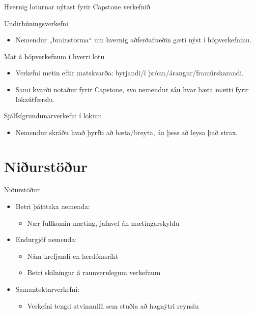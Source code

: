 \documentclass[
    NAME={Dr. Helga Ingimundardóttir},
    EMAIL={helgaingim@hi.is},
    FACULTY={Iðnaðarverkfræði},
    TITLE={Hagnýt hæfni í brennidepli},
    SUBTITLE={Endurskoðun á námskeiði í Viðskiptagreind},
    SEMINAR={Ráðstefna kennsluakademíunnar},
    DATE={22 nóvember, 2024},
    WIDE={true},
    ICELANDIC={true}
]{HI-LaTeX/hi-beamer}
\begin{document}
\begin{frame}{Hvernig loturnar nýtast fyrir Capstone verkefnið}
    \begin{block}{Undirbúningsverkefni}
        \begin{itemize}
            \item Nemendur „brainstorma“ um hvernig aðferðafræðin gæti nýst í hópverkefninu.
        \end{itemize}
    \end{block}
    \begin{block}{Mat á hópverkefnum í hverri lotu}
        \begin{itemize}
            \item Verkefni metin eftir matskvarða: byrjandi/í þróun/árangur/framúrskarandi.
            \item Sami kvarði notaður fyrir Capstone, svo nemendur sáu hvar bæta mætti fyrir lokaútfærslu.
        \end{itemize}
    \end{block}
    \begin{block}{Sjálfsígrundunarverkefni í lokinn}
        \begin{itemize}
            \item Nemendur skráðu hvað þyrfti að bæta/breyta, án þess að leysa það strax.
        \end{itemize}
    \end{block}
\end{frame}



\section{Niðurstöður}
\begin{frame}{Niðurstöður}
    \begin{itemize}
        \item Betri þátttaka nemenda:
        \begin{itemize}
            \item Nær fullkomin mæting, jafnvel án mætingarskyldu
        \end{itemize}
        \item Endurgjöf nemenda:
        \begin{itemize}
            \item Nám krefjandi en lærdómsríkt
            \item Betri skilningur á raunverulegum verkefnum
        \end{itemize}
        \item Samantektarverkefni:
        \begin{itemize}
            \item Verkefni tengd atvinnulífi sem stuðla að hagnýtri reynslu
        \end{itemize}
    \end{itemize}
\end{frame}
\end{document}
